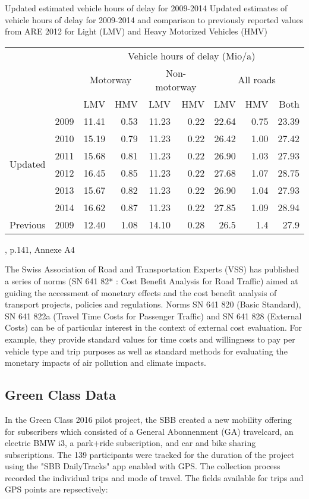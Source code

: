 \createtable%
{Updated estimated vehicle hours of delay for 2009-2014}%
{Updated estimates of vehicle hours of delay for 2009-2014 and comparison to previously reported values from ARE 2012 for Light (LMV) and Heavy Motorized Vehicles (HMV)}%
{\label{tab:vehHoursDelayMkInfras}}%
{%
  \begin{tabular}[c]{lrrrrrrrr}
    \toprule
    \multirow{3}{*}{} & & \multicolumn{7}{c}{Vehicle hours of delay (Mio/a)}\\ 
    & & \multicolumn{2}{c}{Motorway} & \multicolumn{2}{c}{Non-motorway} & \multicolumn{3}{c}{All roads}\\
    & &  LMV & HMV & LMV & HMV & LMV & HMV & Both\\
    \midrule
    \multirow{6}{*}{Updated}
    & 2009 & 11.41 & 0.53 & 11.23 & 0.22 & 22.64 & 0.75 & 23.39 \\
    & 2010 & 15.19 & 0.79 & 11.23 & 0.22 & 26.42 & 1.00 & 27.42 \\
    & 2011 & 15.68 & 0.81 & 11.23 & 0.22 & 26.90 & 1.03 & 27.93 \\
    & 2012 & 16.45 & 0.85 & 11.23 & 0.22 & 27.68 & 1.07 & 28.75 \\
    & 2013 & 15.67 & 0.82 & 11.23 & 0.22 & 26.90 & 1.04 & 27.93 \\
    & 2014 & 16.62 & 0.87 & 11.23 & 0.22 & 27.85 & 1.09 & 28.94 \\
    \midrule
    Previous & 2009 & 12.40 & 1.08 & 14.10 & 0.28 & 26.5 & 1.4 & 27.9 \\
    \bottomrule
  \end{tabular}
}%
{\citet{mkinfras2016staukosten}, p.141, Annexe A4}

The Swiss Association of Road and Transportation Experts (VSS) has published a series of norms (SN 641 82* : Cost Benefit Analysis
for Road Traffic) aimed at guiding the accessment of monetary effects and the cost benefit analysis of transport projects, policies and regulations.
Norms SN 641 820 (Basic Standard), SN 641 822a (Travel Time Costs for Passenger Traffic) and SN 641 828 (External Costs) can be of particular interest in the context of external cost evaluation.
For example, they provide standard values for time costs and willingness to pay per vehicle type and trip purposes as well as standard methods for evaluating the monetary impacts of air pollution and climate impacts.
 

\subsection{Green Class Data}
In the Green Class 2016 pilot project, the SBB created a new mobility offering for subscribers which consisted of a General Abonnenment (GA) travelcard, an electric BMW i3, a park+ride subscription, and car and bike sharing subscriptions.
The 139 participants were tracked for the duration of the project using the "SBB DailyTracks" app enabled with GPS.
The collection process recorded the individual trips and mode of travel.  The fields available for trips and GPS points are repsectively:

